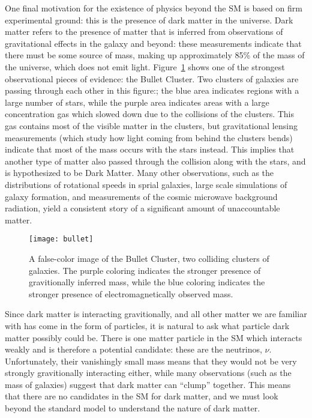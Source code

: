 One final motivation for the existence of physics beyond the SM is based on firm experimental ground: this is the presence of dark matter in the universe. Dark matter refers to the presence of matter that is inferred from observations of gravitational effects in the galaxy and beyond: these measurements indicate that there must be some source of mass, making up approximately 85\% of the mass of the universe, which does not emit light. Figure~\ref{fig:susy:bullet} shows one of the strongest observational pieces of evidence: the Bullet Cluster. Two clusters of galaxies are passing through each other in this figure:; the blue area indicates regions with a large number of stars, while the purple area indicates areas with a large concentration gas which slowed down due to the collisions of the clusters. This gas contains most of the visible matter in the clusters, but gravitational lensing measurements (which study how light coming from behind the clusters bends) indicate that most of the mass occurs with the stars instead. This implies that another type of matter also passed through the collision along with the stars, and is hypothesized to be Dark Matter. Many other observations, such as the distributions of rotational speeds in sprial galaxies, large scale simulations of galaxy formation, and measurements of the cosmic microwave background radiation, yield a consistent story of a significant amount of unaccountable matter.



\begin{figure}
\centering
\texttt{[image: bullet]}
\label{fig:susy:bullet}
\caption{A false-color image of the Bullet Cluster, two colliding clusters of galaxies. The purple coloring indicates the stronger presence of gravitionally inferred mass, while the blue coloring indicates the stronger presence of electromagnetically observed mass.}
\end{figure}


Since dark matter is interacting gravitionally, and all other matter we are familiar with has come in the form of particles, it is natural to ask what particle dark matter possibly could be. There is one matter particle in the SM which interacts weakly and is therefore a potential candidate: these are the neutrinos, $\nu$. Unfortunately, their vanishingly small mass means that they would not be very strongly gravitionally interacting either, while many observations (such as the mass of galaxies) suggest that dark matter can ``clump'' together. This means that there are no candidates in the SM for dark matter, and we must look beyond the standard model to understand the nature of dark matter.


